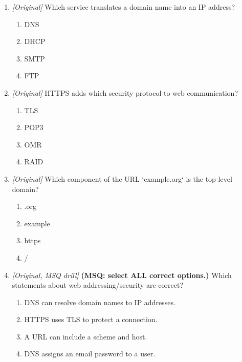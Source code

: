 \begin{enumerate}[label=\textbf{Q\arabic*.}, leftmargin=*]
\item \textit{[Original]} Which service translates a domain name into an IP address?
  \begin{enumerate}[label=\Alph*.]
\item DNS
   \item DHCP
   \item SMTP
   \item FTP
  \end{enumerate}

\item \textit{[Original]} HTTPS adds which security protocol to web communication?
  \begin{enumerate}[label=\Alph*.]
\item TLS
   \item POP3
   \item OMR
   \item RAID
  \end{enumerate}

\item \textit{[Original]} Which component of the URL `example.org` is the top-level domain?
  \begin{enumerate}[label=\Alph*.]
\item .org
   \item example
   \item https
   \item /
  \end{enumerate}

\item \textit{[Original, MSQ drill]} \textbf{(MSQ: select ALL correct options.)} Which statements about web addressing/security are correct?
  \begin{enumerate}[label=\Alph*.]
\item DNS can resolve domain names to IP addresses.
   \item HTTPS uses TLS to protect a connection.
   \item A URL can include a scheme and host.
   \item DNS assigns an email password to a user.
  \end{enumerate}

\end{enumerate}
